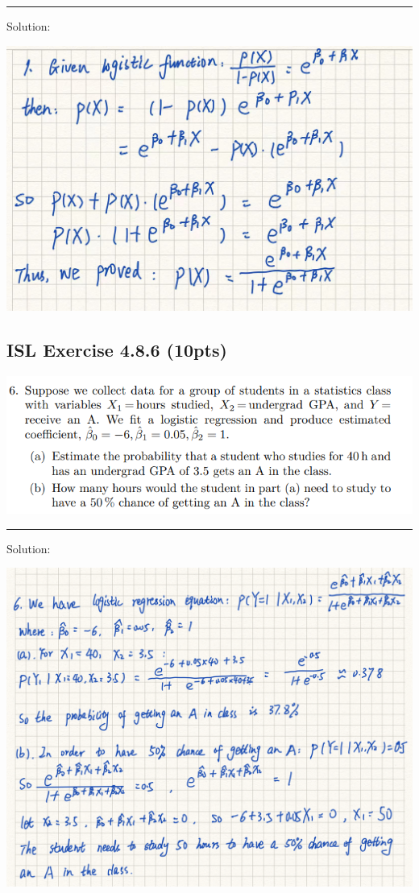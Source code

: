 \documentclass[
]{article}
\begin{document}
\begin{center}\rule{0.5\linewidth}{0.5pt}\end{center}

Solution:

\includegraphics[width=6.875in,height=\textheight]{images/clipboard-2967000257.jpeg}

\hypertarget{isl-exercise-4.8.6-10pts}{%
\subsection{ISL Exercise 4.8.6 (10pts)}\label{isl-exercise-4.8.6-10pts}}

\includegraphics{images/clipboard-2695304714.png}

\begin{center}\rule{0.5\linewidth}{0.5pt}\end{center}

Solution:

\includegraphics[width=6.9375in,height=\textheight]{images/clipboard-3585369922.jpeg}
\end{document}
